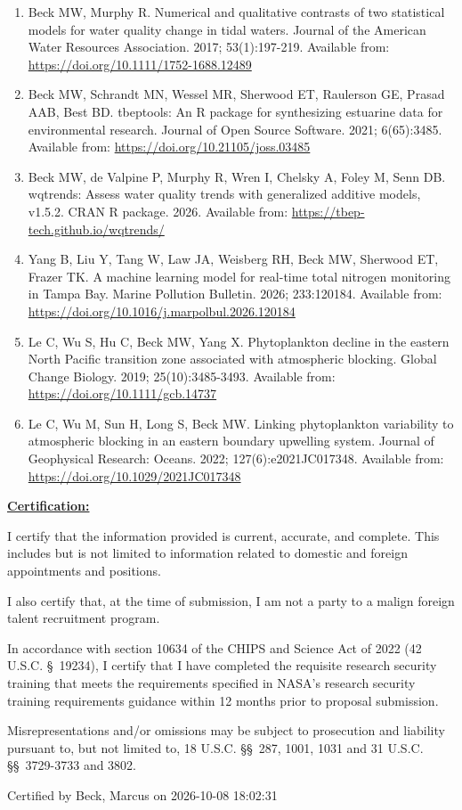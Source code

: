 \documentclass[letterpaper,11pt]{article}
\newcommand{\sechead}[1]{\vspace{6pt}\noindent\underline{\textbf{#1}}\vspace{2pt}\par}
\begin{document}
\begin{enumerate}[leftmargin=1.8em,itemsep=6pt,topsep=2pt]
\item Beck MW, Murphy R. Numerical and qualitative contrasts of two statistical models for water quality change in tidal waters. Journal of the American Water Resources Association. 2017; 53(1):197-219. Available from: \url{https://doi.org/10.1111/1752-1688.12489}

\item Beck MW, Schrandt MN, Wessel MR, Sherwood ET, Raulerson GE, Prasad AAB, Best BD. tbeptools: An R package for synthesizing estuarine data for environmental research. Journal of Open Source Software. 2021; 6(65):3485. Available from: \url{https://doi.org/10.21105/joss.03485}

\item Beck MW, de Valpine P, Murphy R, Wren I, Chelsky A, Foley M, Senn DB. wqtrends: Assess water quality trends with generalized additive models, v1.5.2. CRAN R package. 2026. Available from: \url{https://tbep-tech.github.io/wqtrends/}

\item Yang B, Liu Y, Tang W, Law JA, Weisberg RH, Beck MW, Sherwood ET, Frazer TK. A machine learning model for real-time total nitrogen monitoring in Tampa Bay. Marine Pollution Bulletin. 2026; 233:120184. Available from: \url{https://doi.org/10.1016/j.marpolbul.2026.120184}

\item Le C, Wu S, Hu C, Beck MW, Yang X. Phytoplankton decline in the eastern North Pacific transition zone associated with atmospheric blocking. Global Change Biology. 2019; 25(10):3485-3493. Available from: \url{https://doi.org/10.1111/gcb.14737}

\item Le C, Wu M, Sun H, Long S, Beck MW. Linking phytoplankton variability to atmospheric blocking in an eastern boundary upwelling system. Journal of Geophysical Research: Oceans. 2022; 127(6):e2021JC017348. Available from: \url{https://doi.org/10.1029/2021JC017348}

\end{enumerate}

\sechead{Certification:}

I certify that the information provided is current, accurate, and complete. This includes but is not limited to information related to domestic and foreign appointments and positions.

I also certify that, at the time of submission, I am not a party to a malign foreign talent recruitment program.

In accordance with section 10634 of the CHIPS and Science Act of 2022 (42 U.S.C. \S\ 19234), I certify that I have completed the requisite research security training that meets the requirements specified in NASA's research security training requirements guidance within 12 months prior to proposal submission.

Misrepresentations and/or omissions may be subject to prosecution and liability pursuant to, but not limited to, 18 U.S.C. \S\S\ 287, 1001, 1031 and 31 U.S.C. \S\S\ 3729-3733 and 3802.

Certified by Beck, Marcus on 2026-10-08 18:02:31
\end{document}
